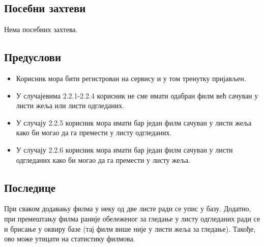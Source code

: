 \subsection{Посебни захтеви}

Нема посебних захтева.

\subsection{Предуслови}

\begin{itemize}
    \item Корисник мора бити регистрован на сервису и у том тренутку пријављен. 
    \item У случајевима 2.2.1-2.2.4 корисник не сме имати одабран филм већ сачуван у листи жеља или листи одгледаних.
    \item У случају 2.2.5 корисник мора имати бар један филм сачуван у листи жеља како би могао 
    да га премести у листу одгледаних.
    \item У случају 2.2.6 корисник мора имати бар један филм сачуван у листи одгледаних како би могао 
    да га премести у листу жеља.
\end{itemize}

\subsection{Последице}

При сваком додавању филма у неку од две листе ради се упис у базу. Додатно, при премештању филма раније 
обележеног за гледање у листу одгледаних ради се и брисање у оквиру базе (тај филм више није у листи жеља за гледање).
Такође, ово може утицати на статистику филмова.

